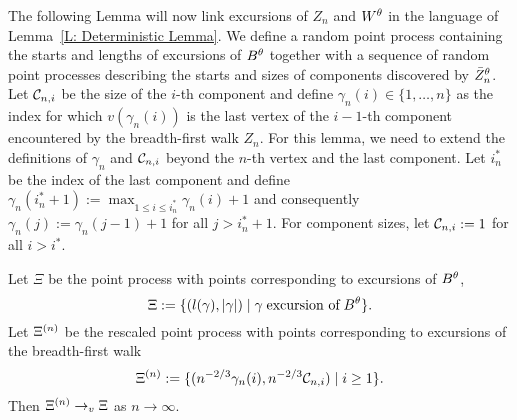 The following Lemma will now link excursions of $Z_n$ and $W^{\theta}$ in the language of Lemma~\ref{L: Deterministic Lemma}.
We define a random point process containing the starts and lengths of excursions of $B^{\theta}$ together with a sequence of random point processes describing the starts and sizes of components discovered by $\bar{Z}^{\theta}_n$.
Let $\mathcal{C}_{n,i}$ be the size of the $i$-th component and
define $\gamma_n(i) \in \{1, \dots, n\}$ as the index for which
$v(\gamma_n(i))$ is the last vertex of the $i-1$-th component encountered by the breadth-first walk $Z_n$.
For this lemma, we need to extend the definitions of $\gamma_n$ and $\mathcal{C}_{n,i}$ beyond the $n$-th vertex and the last component.
Let $i^*_n$ be the index of the last component 
and define $\gamma_n(i^*_n + 1) := \max_{1 \leq i \leq i^*_n}\gamma_n(i) + 1$ 
and consequently $\gamma_n(j) := \gamma_n(j-1) + 1$ for all $j > i^*_n + 1$.
For component sizes, let $\mathcal{C}_{n,i} := 1$ for all $i > i^*$.


\begin{lemma} \label{L: Lemma 8}
	Let $\Xi$ be the point process with points corresponding to excursions of $B^{\theta}$,
	\begin{equation} \label{E: Lemma 8 def Xi}
	\Xi := \{ (l(\gamma), |\gamma|) \; | \; \gamma \; \text{excursion of} \; B^{\theta} \}.
	\end{equation}
	Let $\Xi^{(n)}$ be the rescaled point process with points corresponding to excursions of the breadth-first walk
	\begin{equation} \label{E: Lemma 8 def Xin}
	\Xi^{(n)} := \{ ( n^{-2 / 3} \gamma_n(i), n^{-2 / 3} \mathcal{C}_{n,i} ) \; | \; i \geq 1 \}.
	\end{equation}
	Then $\Xi^{(n)} \rightarrow_v \Xi$ as $n \rightarrow \infty$.
\end{lemma}

